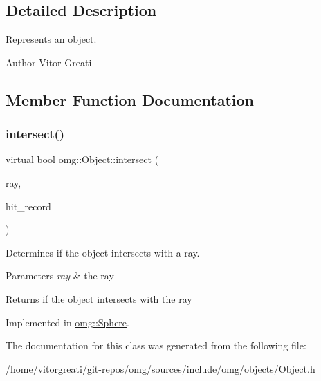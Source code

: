 \subsection{Detailed Description}
Represents an object. 

\begin{DoxyAuthor}{Author}
Vitor Greati 
\end{DoxyAuthor}


\subsection{Member Function Documentation}
\mbox{\label{classomg_1_1_object_aa51d05f4952f3645dc88d5bcc52fed43}} 
\subsubsection{\texorpdfstring{intersect()}{intersect()}}
{\footnotesize\ttfamily virtual bool omg\+::\+Object\+::intersect (\begin{DoxyParamCaption}\item[{\mbox{\hyperlink{classomg_1_1_ray}{Ray}}}]{ray,  }\item[{\mbox{\hyperlink{structomg_1_1_object_1_1_hit_record}{Object\+::\+Hit\+Record}} \&}]{hit\+\_\+record }\end{DoxyParamCaption})\hspace{0.3cm}{\ttfamily [pure virtual]}}



Determines if the object intersects with a ray. 


\begin{DoxyParams}{Parameters}
{\em ray} & the ray \\
\hline
\end{DoxyParams}
\begin{DoxyReturn}{Returns}
if the object intersects with the ray 
\end{DoxyReturn}


Implemented in \mbox{\hyperlink{classomg_1_1_sphere_af1c6cd10afe11eeb3c9d6c42722ab039}{omg\+::\+Sphere}}.



The documentation for this class was generated from the following file\+:\begin{DoxyCompactItemize}
\item 
/home/vitorgreati/git-\/repos/omg/sources/include/omg/objects/Object.\+h\end{DoxyCompactItemize}
